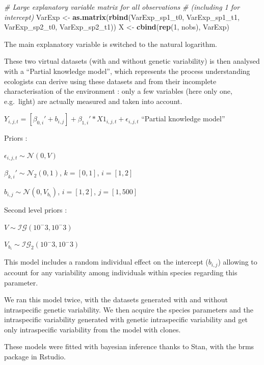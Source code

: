 \documentclass[
]{article}
\newenvironment{Shaded}{\begin{snugshade}}{\end{snugshade}}
\newcommand{\CommentTok}[1]{\textcolor[rgb]{0.56,0.35,0.01}{\textit{#1}}}
\newcommand{\DecValTok}[1]{\textcolor[rgb]{0.00,0.00,0.81}{#1}}
\newcommand{\KeywordTok}[1]{\textcolor[rgb]{0.13,0.29,0.53}{\textbf{#1}}}
\newcommand{\NormalTok}[1]{#1}
\newcommand{\StringTok}[1]{\textcolor[rgb]{0.31,0.60,0.02}{#1}}
\begin{document}
\begin{Shaded}
\begin{Highlighting}[]
\CommentTok{# Large explanatory variable matrix for all observations}
\CommentTok{# (including 1 for intercept)}
\NormalTok{VarExp <-}\StringTok{ }\KeywordTok{as.matrix}\NormalTok{(}\KeywordTok{rbind}\NormalTok{(VarExp_sp1_t0, VarExp_sp1_t1, VarExp_sp2_t0, }
\NormalTok{    VarExp_sp2_t1))}
\NormalTok{X <-}\StringTok{ }\KeywordTok{cbind}\NormalTok{(}\KeywordTok{rep}\NormalTok{(}\DecValTok{1}\NormalTok{, nobs), VarExp)}
\end{Highlighting}
\end{Shaded}

The main explanatory variable is switched to the natural logarithm.

These two virtual datasets (with and without genetic variability) is
then analysed with a ``Partial knowledge model'', which represents the
process understanding ecologists can derive using these datasets and
from their incomplete characterisation of the environment : only a few
variables (here only one, e.g.~light) are actually measured and taken
into account.

\(Y_{i,j,t} =[\beta_{0,i}\prime + b_{i,j}] + \beta_{1,i}\prime * X1_{i,j,t} + \epsilon_{i,j,t}\)
\hfill``Partial knowledge model''

Priors :

\(\epsilon_{i,j,t} \sim \mathcal{N}(0, V)\)

\(\beta_{k,i}\prime\sim \mathcal{N}_2(0, 1)\), \(k = [0, 1]\),
\(i = [1, 2]\)

\(b_{i,j} \sim \mathcal{N}(0, V_{b_i})\), \(i = [1, 2]\),
\(j = [1, 500]\)

Second level priors :

\(V \sim \mathcal{IG}(10^-3, 10^-3)\)

\(V_{b_i} \sim \mathcal{IG}_2(10^-3, 10^-3)\)

This model includes a random individual effect on the intercept
(\(b_{i,j}\)) allowing to account for any variability among individuals
within species regarding this parameter.

We ran this model twice, with the datasets generated with and without
intraspecific genetic variability. We then acquire the species
parameters and the intraspecific variability generated with genetic
intraspecific variability and get only intraspecific variability from
the model with clones.

These models were fitted with bayesian inference thanks to Stan, with
the brms package in Rstudio.
\end{document}
